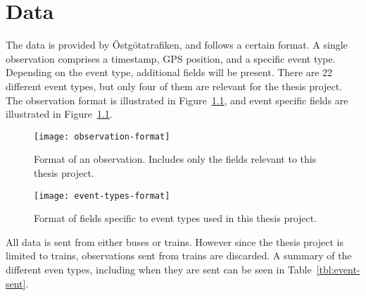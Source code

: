 \chapter{Data}\label{ch:data}
The data is provided by Östgötatrafiken, and follows a certain format.
A single observation comprises a timestamp, GPS position, and a
specific event type. Depending on the event type,
additional fields will be present. There are 22 different event types,
but only four of them are relevant for the thesis project.
The observation format is illustrated in 
Figure~\ref{fig:example-observation}, and event specific fields are
illustrated in Figure~\ref{fig:example-observation}.
\begin{figure}
  \centering
  \texttt{[image: observation-format]}
  \caption{Format of an observation. Includes only the
    fields relevant to this thesis project.}\label{fig:example-observation}
\end{figure}

\begin{figure}
  \centering
  \texttt{[image: event-types-format]}
  \caption{Format of fields specific to event types used in this
    thesis project.}\label{fig:event-types-format}
\end{figure}
All data is sent from either buses or trains. However since the thesis
project is limited to trains, observations sent from trains are
discarded. A summary of the different even types, including when they
are sent can be seen in Table~\ref{tbl:event-sent}.

\begin{table}
  \centering
  \caption{Summary of the event types used in the thesis project.}\label{tbl:event-sent}
\end{table}

